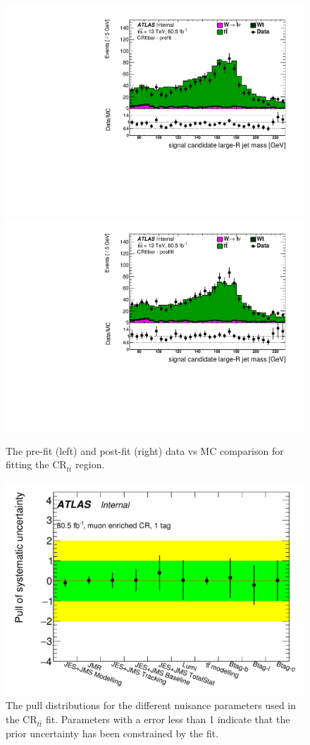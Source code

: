 \begin{figure}[!htbp]
\centering
\includegraphics[width=0.49\linewidth]{figures/backgrounds/ttbar_prefit} \hfill
\includegraphics[width=0.49\linewidth]{figures/backgrounds/ttbar_postfit}
\caption{The pre-fit (left) and post-fit (right) data vs MC comparison for fitting the $\text{CR}_{t\bar{t}}$ region.}
\label{sec:background:ttbar_fit}
\end{figure}

\begin{figure}[!htbp]
\centering
\includegraphics[width=0.7\linewidth]{figures/backgrounds/ttbar_pulls}
\caption{The pull distributions for the different nuisance parameters used in the $\text{CR}_{t\bar{t}}$ fit. Parameters with a error less than 1 indicate that the prior uncertainty has been constrained by the fit.}
\label{sec:background:ttbar_pulls}
\end{figure}
